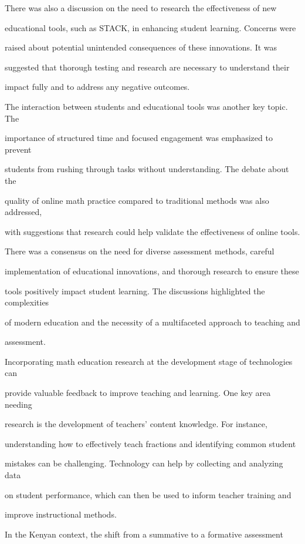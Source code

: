 \documentclass[11pt]{article}
\begin{document}
There was also a discussion on the need to research the effectiveness of new

educational tools, such as STACK, in enhancing student learning. Concerns were

raised about potential unintended consequences of these innovations. It was

suggested that thorough testing and research are necessary to understand their

impact fully and to address any negative outcomes.

The interaction between students and educational tools was another key topic. The

importance of structured time and focused engagement was emphasized to prevent

students from rushing through tasks without understanding. The debate about the

quality of online math practice compared to traditional methods was also addressed,

with suggestions that research could help validate the effectiveness of online tools.

There was a consensus on the need for diverse assessment methods, careful

implementation of educational innovations, and thorough research to ensure these

tools positively impact student learning. The discussions highlighted the complexities

of modern education and the necessity of a multifaceted approach to teaching and

assessment.

Incorporating math education research at the development stage of technologies can

provide valuable feedback to improve teaching and learning. One key area needing

research is the development of teachers' content knowledge. For instance,

understanding how to effectively teach fractions and identifying common student

mistakes can be challenging. Technology can help by collecting and analyzing data

on student performance, which can then be used to inform teacher training and

improve instructional methods.

In the Kenyan context, the shift from a summative to a formative assessment
\end{document}
